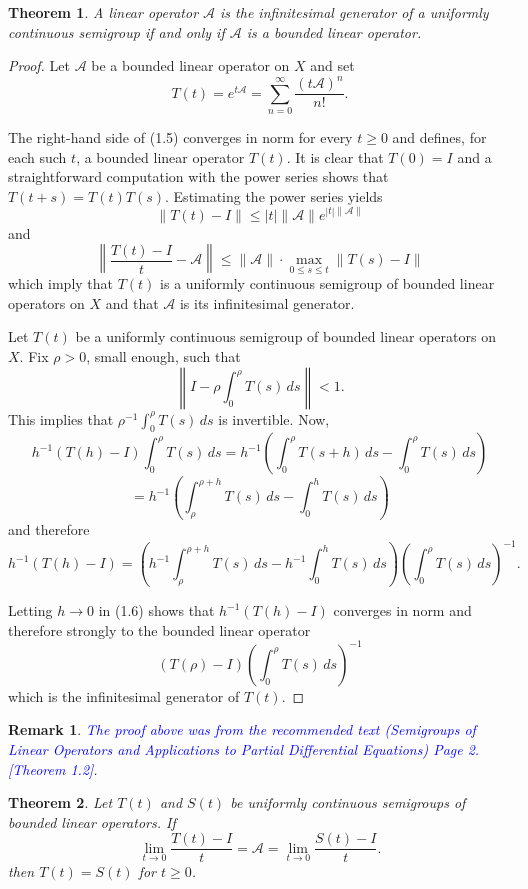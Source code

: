 \documentclass[12pt, oneside]{book}
\newtheorem{remark}{Remark}[section]
\newtheorem{theo}{Theorem}[section]
\begin{document}
\begin{theo}\label{theorem 2.2.1}
	A linear operator $\mathscr{A}$ is the infinitesimal generator of a uniformly
	continuous semigroup if and only if $\mathscr{A}$ is a bounded linear operator.
\end{theo}
\begin{proof}
	Let $\mathscr{A}$ be a bounded linear operator on $X$ and set
	\[
	T(t)=e^{t\mathscr{A}}=\sum_{n=0}^{\infty}\frac{(t\mathscr{A})^n}{n!}.
	\tag{1.5}
	\]
	
	The right-hand side of (1.5) converges in norm for every $t\geq 0$ and defines,
	for each such $t$, a bounded linear operator $T(t)$. It is clear that $T(0)=I$
	and a straightforward computation with the power series shows that
	$T(t+s)=T(t)T(s)$. Estimating the power series yields
	\[
	\|T(t)-I\|\leq |t|\|\mathscr{A}\|e^{|t|\|\mathscr{A}\|}
	\]
	and
	\[
	\left\|\frac{T(t)-I}{t}-\mathscr{A}\right\|
	\leq \|\mathscr{A}\|\cdot \max_{0\leq s\leq t}\|T(s)-I\|
	\]
	which imply that $T(t)$ is a uniformly continuous semigroup of bounded
	linear operators on $X$ and that $\mathscr{A}$ is its infinitesimal generator.
	
	\medskip
	
	Let $T(t)$ be a uniformly continuous semigroup of bounded linear operators
	on $X$. Fix $\rho>0$, small enough, such that
	\[
	\left\|I-\rho\int_{0}^{\rho}T(s)\,ds\right\|<1.
	\]
	This implies that $\rho^{-1}\int_{0}^{\rho}T(s)\,ds$ is invertible.
	Now,
	\[
	h^{-1}(T(h)-I)\int_{0}^{\rho}T(s)\,ds
	=
	h^{-1}\left(\int_{0}^{\rho}T(s+h)\,ds-\int_{0}^{\rho}T(s)\,ds\right)
	\]
	\[
	=
	h^{-1}\left(\int_{\rho}^{\rho+h}T(s)\,ds-\int_{0}^{h}T(s)\,ds\right)
	\]
	and therefore
	\[
	h^{-1}(T(h)-I)
	=
	\left(
	h^{-1}\int_{\rho}^{\rho+h}T(s)\,ds
	-
	h^{-1}\int_{0}^{h}T(s)\,ds
	\right)
	\left(\int_{0}^{\rho}T(s)\,ds\right)^{-1}.
	\tag{1.6}
	\]
	
	Letting $h\to 0$ in (1.6) shows that $h^{-1}(T(h)-I)$ converges in norm and
	therefore strongly to the bounded linear operator
	\[
	(T(\rho)-I)\left(\int_{0}^{\rho}T(s)\,ds\right)^{-1}
	\]
	which is the infinitesimal generator of $T(t)$.
\end{proof}
\begin{remark}
	\textcolor{blue}{The proof above was from the recommended text (Semigroups of Linear Operators and Applications to Partial Differential Equations) Page 2. [Theorem 1.2].}
\end{remark}

\begin{theo}\label{theorem 2.2.2}
Let $T(t)$ and $S(t)$ be uniformly continuous semigroups of
bounded linear operators. If
\[
\lim_{t\to 0}\frac{T(t)-I}{t}
=
\mathscr{A}
=
\lim_{t\to 0}\frac{S(t)-I}{t}.
\tag{1.7}
\]
then $T(t)=S(t)$ for $t\geq 0$.

\end{theo}
\end{document}
